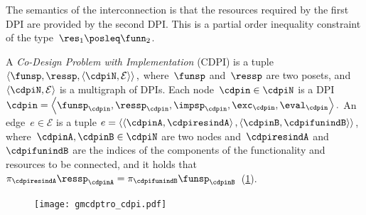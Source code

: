 
\noindent The semantics of the interconnection is that the resources
required by the first DPI are provided by the second DPI. This is
a partial order inequality constraint of the type~$\res_{1}\posleq\funn_{2}$.

\begin{definition}
\label{def:cdpi}A \emph{Co-Design Problem with Implementation} (CDPI)
is a tuple $\left\langle \funsp,\ressp,\left\langle \cdpiN,\mathcal{E}\right\rangle \right\rangle ,$
where~$\funsp$ and~$\ressp$ are two posets, and~$\left\langle \cdpiN,\mathcal{E}\right\rangle $
is a\emph{ }multigraph of DPIs. Each node~$\cdpin\in\cdpiN$ is a
DPI $\cdpin=\left\langle \funsp_{\cdpin},\ressp_{\cdpin},\impsp_{\cdpin},\exc_{\cdpin},\eval_{\cdpin}\right\rangle .$
An edge~$e\in\mathcal{E}$ is a tuple $e=\left\langle \left\langle \cdpinA,\cdpiresindA\right\rangle ,\left\langle \cdpinB,\cdpifunindB\right\rangle \right\rangle $,
where~$\cdpinA,\cdpinB\in\cdpiN$ are two nodes and~$\cdpiresindA$
and~$\cdpifunindB$ are the indices of the components of the functionality
and resources to be connected, and it holds that~$\pi_{\cdpiresindA}\ressp_{\cdpinA}=\pi_{\cdpifunindB}\funsp_{\cdpinB}$~(\cref{fig:mcdps}). 

\begin{figure}[h]
    \centering
    \texttt{[image: gmcdptro\_cdpi.pdf]}
    \caption{\label{fig:mcdps}}
\end{figure}


\end{definition}

